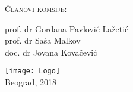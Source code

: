 \documentclass[
11pt, %
serbian,
singlespacing, %
headsepline, %
]{MastersDoctoralThesis} %
\begin{document}
\begin{titlepage}
\begin{center}
{\scshape\LARGE Članovi komsije:\par}\vspace{0.2cm} %
prof. dr Gordana Pavlović-Lažetić \\
prof. dr Saša Malkov \\
doc. dr Jovana Kovačević \\

 
\vfill

\vspace{1cm}
\texttt{[image: Logo]}\\ %
\vspace{0.5cm}
{\large Beograd, 2018}\\ %
 
\vfill
\end{center}
\end{titlepage}


%
%  
%  
%
\end{document}
